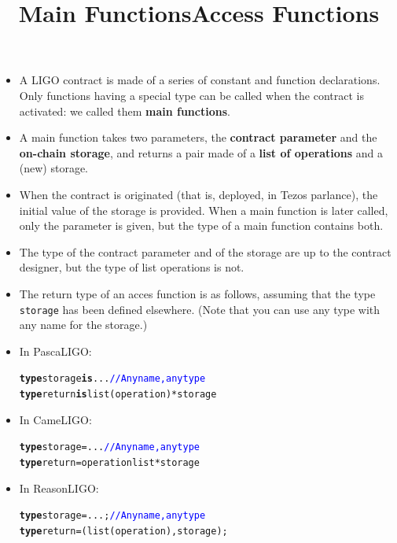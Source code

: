 \documentclass[wide]{slides}
\newcommand{\Kis}[0]{\textbf{is}\xspace}
\newcommand{\Ktype}[0]{\textbf{type}\xspace}
\newcommand{\com}[1]{\textcolor{blue}{{#1}}}
\begin{document}
\begin{slide}
  \title{Main Functions}

  \begin{itemize}

    \item A LIGO contract is made of a series of constant and function
      declarations. Only functions having a special type can be called
      when the contract is activated: we called them \textbf{main
        functions}.

    \item A main function takes two parameters, the
      \textbf{contract parameter} and the \textbf{on-chain storage},
      and returns a pair made of a \textbf{list of operations} and a
      (new) storage.

    \item When the contract is originated (that is, deployed, in Tezos
      parlance), the initial value of the storage is provided. When a
      main function is later called, only the parameter is given,
      but the type of a main function contains both.

    \item The type of the contract parameter and of the storage are up
      to the contract designer, but the type of list operations is
      not.

  \end{itemize}

\end{slide}

\begin{slide}
  \title{Access Functions}

  \begin{itemize}

    \item The return type of an acces function is as follows, assuming
      that the type \texttt{storage} has been defined elsewhere. (Note
      that you can use any type with any name for the storage.)

    \item In PascaLIGO:
      \begin{alltt}
\Ktype storage \Kis ...  \com{// Any name, any type}
\Ktype return \Kis list (operation) * storage
      \end{alltt}

    \item In CameLIGO:
      \begin{alltt}
\Ktype storage = ...  \com{// Any name, any type}
\Ktype return = operation list * storage
      \end{alltt}

    \item In ReasonLIGO:
      \begin{alltt}
\Ktype storage = ...;  \com{// Any name, any type}
\Ktype return = (list (operation), storage);
      \end{alltt}

  \end{itemize}

\end{slide}
\end{document}
